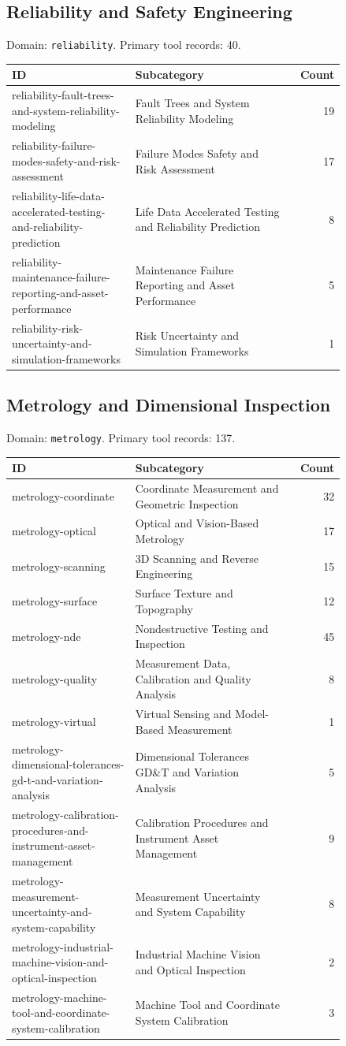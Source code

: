 \subsection{Reliability and Safety Engineering}
\noindent Domain: \texttt{reliability}. Primary tool records: 40.
\begin{longtable}{p{0.37\linewidth}p{0.47\linewidth}r}
ID & Subcategory & Count\\\hline\endhead
reliability-fault-trees-and-system-reliability-modeling & Fault Trees and System Reliability Modeling & 19\\
reliability-failure-modes-safety-and-risk-assessment & Failure Modes Safety and Risk Assessment & 17\\
reliability-life-data-accelerated-testing-and-reliability-prediction & Life Data Accelerated Testing and Reliability Prediction & 8\\
reliability-maintenance-failure-reporting-and-asset-performance & Maintenance Failure Reporting and Asset Performance & 5\\
reliability-risk-uncertainty-and-simulation-frameworks & Risk Uncertainty and Simulation Frameworks & 1\\
\end{longtable}
\subsection{Metrology and Dimensional Inspection}
\noindent Domain: \texttt{metrology}. Primary tool records: 137.
\begin{longtable}{p{0.37\linewidth}p{0.47\linewidth}r}
ID & Subcategory & Count\\\hline\endhead
metrology-coordinate & Coordinate Measurement and Geometric Inspection & 32\\
metrology-optical & Optical and Vision-Based Metrology & 17\\
metrology-scanning & 3D Scanning and Reverse Engineering & 15\\
metrology-surface & Surface Texture and Topography & 12\\
metrology-nde & Nondestructive Testing and Inspection & 45\\
metrology-quality & Measurement Data, Calibration and Quality Analysis & 8\\
metrology-virtual & Virtual Sensing and Model-Based Measurement & 1\\
metrology-dimensional-tolerances-gd-t-and-variation-analysis & Dimensional Tolerances GD\&T and Variation Analysis & 5\\
metrology-calibration-procedures-and-instrument-asset-management & Calibration Procedures and Instrument Asset Management & 9\\
metrology-measurement-uncertainty-and-system-capability & Measurement Uncertainty and System Capability & 8\\
metrology-industrial-machine-vision-and-optical-inspection & Industrial Machine Vision and Optical Inspection & 2\\
metrology-machine-tool-and-coordinate-system-calibration & Machine Tool and Coordinate System Calibration & 3\\
\end{longtable}
